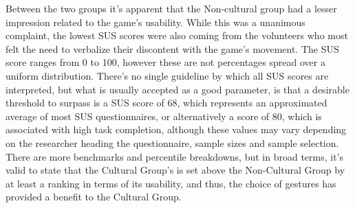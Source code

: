     Between the two groups it’s apparent that the Non-cultural group had a lesser impression related to the game’s usability. While this was a unanimous complaint, the lowest SUS scores were also coming from the volunteers who most felt the need to verbalize their discontent with the game’s movement. The SUS score ranges from 0 to 100, however these are not percentages spread over a uniform distribution. There’s no single guideline by which all SUS scores are interpreted, but what is usually accepted as a good parameter, is that a desirable threshold to surpass is a SUS score of 68, which represents an approximated average of most SUS questionnaires, or alternatively a score of 80, which is associated with high task completion\cite{sauro2011practical}, although these values may vary depending on the researcher heading the questionnaire, sample sizes and sample selection. There are more benchmarks and percentile breakdowns, but in broad terms, it’s valid to state that the Cultural Group’s is set above the Non-Cultural Group by at least a ranking in terms of its usability, and thus, the choice of gestures has provided a benefit to the Cultural Group.\\


